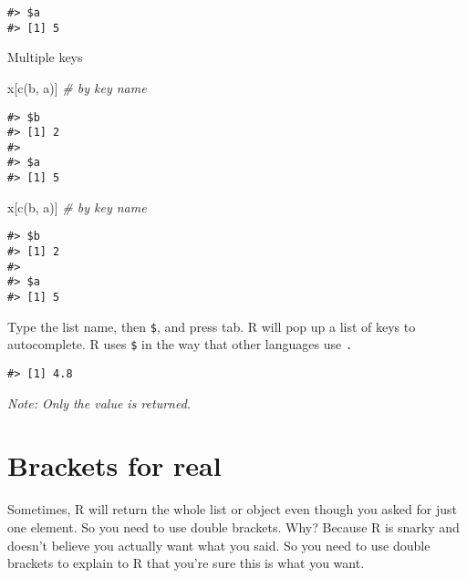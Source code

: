 \documentclass[
]{book}
\newenvironment{Shaded}{\begin{snugshade}}{\end{snugshade}}
\newcommand{\CommentTok}[1]{\textcolor[rgb]{0.56,0.35,0.01}{\textit{#1}}}
\newcommand{\FunctionTok}[1]{\textcolor[rgb]{0.00,0.00,0.00}{#1}}
\newcommand{\NormalTok}[1]{#1}
\newcommand{\SpecialCharTok}[1]{\textcolor[rgb]{0.00,0.00,0.00}{#1}}
\newcommand{\StringTok}[1]{\textcolor[rgb]{0.31,0.60,0.02}{#1}}
\begin{document}
\begin{verbatim}
#> $a
#> [1] 5
\end{verbatim}

Multiple keys

\begin{Shaded}
\begin{Highlighting}[]
\NormalTok{x[}\FunctionTok{c}\NormalTok{(}\StringTok{\textquotesingle{}b\textquotesingle{}}\NormalTok{, }\StringTok{\textquotesingle{}a\textquotesingle{}}\NormalTok{)] }\CommentTok{\# by key name}
\end{Highlighting}
\end{Shaded}

\begin{verbatim}
#> $b
#> [1] 2
#> 
#> $a
#> [1] 5
\end{verbatim}

\begin{Shaded}
\begin{Highlighting}[]
\NormalTok{x[}\FunctionTok{c}\NormalTok{(}\StringTok{\textquotesingle{}b\textquotesingle{}}\NormalTok{, }\StringTok{\textquotesingle{}a\textquotesingle{}}\NormalTok{)] }\CommentTok{\# by key name}
\end{Highlighting}
\end{Shaded}

\begin{verbatim}
#> $b
#> [1] 2
#> 
#> $a
#> [1] 5
\end{verbatim}

Type the list name, then \texttt{\$}, and press tab. R will pop up a list of keys to autocomplete.
R uses \texttt{\$} in the way that other languages use \texttt{.}

\begin{Shaded}
\end{Shaded}

\begin{verbatim}
#> [1] 4.8
\end{verbatim}

\emph{Note: Only the value is returned.}

\hypertarget{brackets-for-real}{%
\section{Brackets for real}\label{brackets-for-real}}

Sometimes, R will return the whole list or object even though you asked for just one element. So you need to use double brackets. Why? Because R is snarky and doesn't believe you actually want what you said. So you need to use double brackets to explain to R that you're sure this is what you want.
\end{document}
